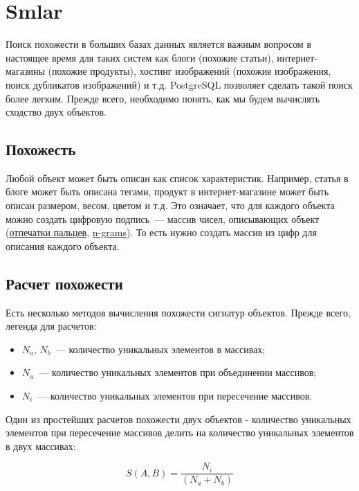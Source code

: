 \section{Smlar}

Поиск похожести в больших базах данных является важным вопросом в настоящее время для таких систем как блоги (похожие статьи), интернет-магазины (похожие продукты), хостинг изображений (похожие изображения, поиск дубликатов изображений) и т.д. PostgreSQL позволяет сделать такой поиск более легким. Прежде всего, необходимо понять, как мы будем вычислять сходство двух объектов.

\subsection{Похожесть}

Любой объект может быть описан как список характеристик. Например, статья в блоге может быть описана тегами, продукт в интернет-магазине может быть описан размером, весом, цветом и т.д. Это означает, что для каждого объекта можно создать цифровую подпись~--- массив чисел, описывающих объект (\href{http://en.wikipedia.org/wiki/Fingerprint}{отпечатки пальцев}, \href{http://en.wikipedia.org/wiki/N-gram}{n-grams}). То есть нужно создать массив из цифр для описания каждого объекта.

\subsection{Расчет похожести}

Есть несколько методов вычисления похожести сигнатур объектов. Прежде всего, легенда для расчетов:

\begin{itemize}
  \item $N_a$, $N_b$~--- количество уникальных элементов в массивах;
  \item $N_u$~--- количество уникальных элементов при объединении массивов;
  \item $N_i$~--- количество уникальных элементов при пересечение массивов.
\end{itemize}

Один из простейших расчетов похожести двух объектов - количество уникальных элементов при пересечение массивов делить на количество уникальных элементов в двух массивах:

\begin{equation}
 \label{eq:smlar1}
 S(A,B) = \frac{N_{i}}{(N_{a}+N_{b})}
\end{equation}

